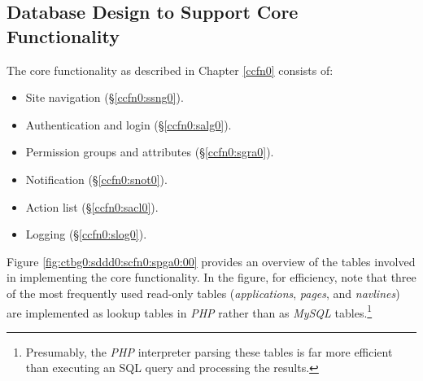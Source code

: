 \subsection{Database Design to Support Core Functionality}
\label{ctbg0:sddd0:scfn0}

The core functionality as described in Chapter \ref{ccfn0} consists of:

\begin{itemize}
\item Site navigation (\S{}\ref{ccfn0:ssng0}).
\item Authentication and login (\S{}\ref{ccfn0:salg0}).
\item Permission groups and attributes (\S{}\ref{ccfn0:sgra0}).
\item Notification (\S{}\ref{ccfn0:snot0}).
\item Action list (\S{}\ref{ccfn0:sacl0}).
\item Logging (\S{}\ref{ccfn0:slog0}).
\end{itemize}

Figure \ref{fig:ctbg0:sddd0:scfn0:spga0:00} provides an overview of the
tables involved in implementing the core functionality.  In the figure,
for efficiency, note that three of the most frequently
used read-only tables (\emph{applications}, \emph{pages},
and \emph{navlines}) are implemented as lookup tables in 
\emph{PHP} rather than
as \emph{MySQL} tables.\footnote{Presumably, the \emph{PHP}
interpreter parsing these tables is far more efficient than executing
an SQL query and processing the results.}

